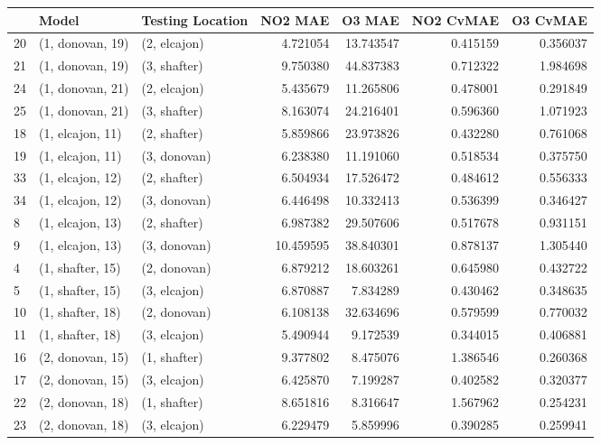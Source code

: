 \begin{tabular}{lllrrrr}
\toprule
{} &             Model & Testing Location &    NO2 MAE &     O3 MAE &  NO2 CvMAE &  O3 CvMAE \\
\midrule
20 &  (1, donovan, 19) &     (2, elcajon) &   4.721054 &  13.743547 &   0.415159 &  0.356037 \\
21 &  (1, donovan, 19) &     (3, shafter) &   9.750380 &  44.837383 &   0.712322 &  1.984698 \\
24 &  (1, donovan, 21) &     (2, elcajon) &   5.435679 &  11.265806 &   0.478001 &  0.291849 \\
25 &  (1, donovan, 21) &     (3, shafter) &   8.163074 &  24.216401 &   0.596360 &  1.071923 \\
18 &  (1, elcajon, 11) &     (2, shafter) &   5.859866 &  23.973826 &   0.432280 &  0.761068 \\
19 &  (1, elcajon, 11) &     (3, donovan) &   6.238380 &  11.191060 &   0.518534 &  0.375750 \\
33 &  (1, elcajon, 12) &     (2, shafter) &   6.504934 &  17.526472 &   0.484612 &  0.556333 \\
34 &  (1, elcajon, 12) &     (3, donovan) &   6.446498 &  10.332413 &   0.536399 &  0.346427 \\
8  &  (1, elcajon, 13) &     (2, shafter) &   6.987382 &  29.507606 &   0.517678 &  0.931151 \\
9  &  (1, elcajon, 13) &     (3, donovan) &  10.459595 &  38.840301 &   0.878137 &  1.305440 \\
4  &  (1, shafter, 15) &     (2, donovan) &   6.879212 &  18.603261 &   0.645980 &  0.432722 \\
5  &  (1, shafter, 15) &     (3, elcajon) &   6.870887 &   7.834289 &   0.430462 &  0.348635 \\
10 &  (1, shafter, 18) &     (2, donovan) &   6.108138 &  32.634696 &   0.579599 &  0.770032 \\
11 &  (1, shafter, 18) &     (3, elcajon) &   5.490944 &   9.172539 &   0.344015 &  0.406881 \\
16 &  (2, donovan, 15) &     (1, shafter) &   9.377802 &   8.475076 &   1.386546 &  0.260368 \\
17 &  (2, donovan, 15) &     (3, elcajon) &   6.425870 &   7.199287 &   0.402582 &  0.320377 \\
22 &  (2, donovan, 18) &     (1, shafter) &   8.651816 &   8.316647 &   1.567962 &  0.254231 \\
23 &  (2, donovan, 18) &     (3, elcajon) &   6.229479 &   5.859996 &   0.390285 &  0.259941 \\

\end{tabular}
